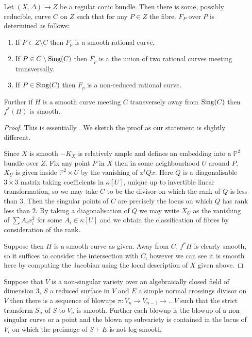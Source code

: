 \begin{lemma}
	Let $(X,\Delta) \to Z$ be a regular conic bundle. Then there is some, possibly reducible, curve $C$ on $Z$ such that for any $P \in Z$ the fibre. $F_{P}$ over $P$ is determined as follows:
	\begin{enumerate}
		\item If $P \in Z\setminus C$ then $F_{p}$ is a smooth rational curve.
		\item If $P \in C\setminus \text{Sing}(C)$ then $F_{p}$ is a the union of two rational curves meeting transversally.
		\item If $P \in \text{Sing}(C)$ then $F_{p}$ is a non-reduced rational curve.
	\end{enumerate}
	Further if $H$ is a smooth curve meeting $C$ transversely away from $\text{Sing}(C)$ then $f^{*}(H)$ is smooth.
\end{lemma}
\begin{proof}
	This is essentially \cite[Proposition 1.8]{sarkisov1983conic}. We sketch the proof as our statement is slightly different.
	
	Since $X$ is smooth $-K_{X}$ is relatively ample and defines an embedding into a $\mathbb{P}^{2}$ bundle over $Z$.
	Fix any point $P$ in $X$ then in some neighbourhood $U$ around $P$, $X_{U}$ is given inside $\mathbb{P}^{2} \times U$ by the vanishing of $x^{t}Qx$. Here $Q$ is a diagonalisable $3\times 3$ matrix taking coefficients in $\kappa[U]$, unique up to invertible linear transformation, so we may take $C$ to be the divisor on which the rank of $Q$ is less than $3$. Then the singular points of $C$ are precisely the locus on which $Q$ has rank less than $2$. By taking a diagonalisation of $Q$ we may write $X_{U}$ as the vanishing of $\sum A_{i}x_{i}^{2}$ for some $A_{i} \in \kappa[U]$ and we obtain the classification of fibres by consideration of the rank.
	
	Suppose then $H$ is a smooth curve as given. Away from $C$, $f^{*}H$ is clearly smooth, so it suffices to consider the intersection with $C$, however we can see it is smooth here by computing the Jacobian using the local description of $X$ given above. 
\end{proof}


\begin{theorem}\cite[Theorem 1.2]{cutkosky2009resolution}
	Suppose that $V$ is a non-singular variety over an algebraically closed field of dimension $3$, $S$ a reduced surface in $V$ and $E$ a simple normal crossings divisor on $V$ then there is a sequence of blowups $\pi\colon V_{n} \to V_{n-1} \to ... V$ such that the strict transform $S_{n}$ of $S$ to $V_{n}$ is smooth. Further each blowup is the blowup of a non-singular curve or a point and the blown up subvariety is contained in the locus of $V_{i}$ on which the preimage of $S+E$ is not log smooth.
\end{theorem}

